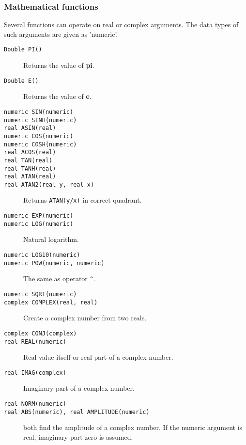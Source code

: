 \subsubsection{Mathematical functions}
Several functions can operate on real or complex arguments.
The data types of such arguments are given as 'numeric'.
\begin{description}
  \item[ \texttt{Double PI()}] Returns the value of \textbf{pi}.
  \item[ \texttt{Double E()}] Returns the value of \textbf{e}.
  \item[ \texttt{numeric SIN(numeric)}]
  \item[ \texttt{numeric SINH(numeric)}]
  \item[ \texttt{real ASIN(real)}]
  \item[ \texttt{numeric COS(numeric)}]
  \item[ \texttt{numeric COSH(numeric)}]
  \item[ \texttt{real ACOS(real)}]
  \item[ \texttt{real TAN(real)}]
  \item[ \texttt{real TANH(real)}]
  \item[ \texttt{real ATAN(real)}]
  \item[ \texttt{real ATAN2(real y, real x)}]
       Returns \texttt{ATAN(y/x)} in correct quadrant.
  \item[ \texttt{numeric EXP(numeric)}]
  \item[ \texttt{numeric LOG(numeric)}] Natural logarithm.
  \item[ \texttt{numeric LOG10(numeric)}]
  \item[ \texttt{numeric POW(numeric, numeric)}] The same as operator \verb+^+.
  \item[ \texttt{numeric SQRT(numeric)}]
  \item[ \texttt{complex COMPLEX(real, real)}]
       Create a complex number from two reals.
  \item[ \texttt{complex CONJ(complex)}]
  \item[ \texttt{real REAL(numeric)}] Real value itself or
    real part of a complex number.
  \item[ \texttt{real IMAG(complex)}] Imaginary part of a complex number.
  \item[ \texttt{real NORM(numeric)}]
  \item[ \texttt{real ABS(numeric),  real AMPLITUDE(numeric)}]
     both find the amplitude of a complex number.
     If the  numeric argument is real, imaginary part zero is assumed.

\end{description}
